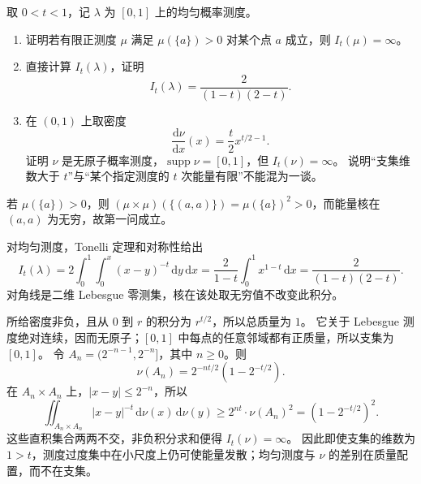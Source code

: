 \begin{optionalexercise}\label{b1:ex:15-energy-choice}
取 \(0<t<1\)，记 \(\lambda\) 为 \([0,1]\) 上的均匀概率测度。
\begin{enumerate}
\item\label{b1:item:15-atom-energy}
证明若有限正测度 \(\mu\) 满足 \(\mu(\{a\})>0\) 对某个点 \(a\) 成立，则 \(I_t(\mu)=\infty\)。
\item\label{b1:item:15-uniform-energy}
直接计算 \(I_t(\lambda)\)，证明
\[
 I_t(\lambda)=\frac{2}{(1-t)(2-t)}.
\]
\item\label{b1:item:15-nonatomic-infinite-energy}
在 \((0,1)\) 上取密度
\[
 \frac{\mathrm d\nu}{\mathrm dx}(x)=\frac t2x^{t/2-1}.
\]
证明 \(\nu\) 是无原子概率测度，\(\operatorname{supp}\nu=[0,1]\)，但 \(I_t(\nu)=\infty\)。
说明“支集维数大于 \(t\)”与“某个指定测度的 \(t\) 次能量有限”不能混为一谈。
\end{enumerate}
\end{optionalexercise}
\begin{solution}
若 \(\mu(\{a\})>0\)，则 \((\mu\times\mu)(\{(a,a)\})=\mu(\{a\})^2>0\)，而能量核在 \((a,a)\) 为无穷，故第一问成立。

对均匀测度，Tonelli 定理和对称性给出
\[
 I_t(\lambda)
 =2\int_0^1\int_0^x(x-y)^{-t}\,\mathrm dy\,\mathrm dx
 =\frac2{1-t}\int_0^1x^{1-t}\,\mathrm dx
 =\frac2{(1-t)(2-t)}.
\]
对角线是二维 Lebesgue 零测集，核在该处取无穷值不改变此积分。

所给密度非负，且从 \(0\) 到 \(r\) 的积分为 \(r^{t/2}\)，所以总质量为 \(1\)。
它关于 Lebesgue 测度绝对连续，因而无原子；\([0,1]\) 中每点的任意邻域都有正质量，所以支集为 \([0,1]\)。
令 \(A_n=(2^{-n-1},2^{-n}]\)，其中 \(n\ge0\)。则
\[
 \nu(A_n)=2^{-nt/2}(1-2^{-t/2}).
\]
在 \(A_n\times A_n\) 上，\(|x-y|\le2^{-n}\)，所以
\[
 \iint_{A_n\times A_n}|x-y|^{-t}\,\mathrm d\nu(x)\,\mathrm d\nu(y)
 \ge2^{nt}\cdot \nu(A_n)^2=(1-2^{-t/2})^2.
\]
这些直积集合两两不交，非负积分求和便得 \(I_t(\nu)=\infty\)。
因此即使支集的维数为 \(1>t\)，测度过度集中在小尺度上仍可使能量发散；均匀测度与 \(\nu\) 的差别在质量配置，而不在支集。
\end{solution}

